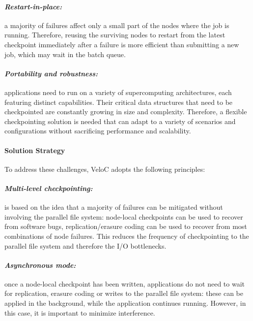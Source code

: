\paragraph{\emph{Restart-in-place:}} a majority of failures affect
only a small part of the nodes where the job is running. Therefore,
reusing the surviving nodes to restart from the latest checkpoint
immediately after a failure is more efficient than submitting a new job,
which may wait in the batch queue.
\vspace{-1em}

\paragraph{\emph{Portability and robustness:}} applications need to
run on a variety of supercomputing architectures, each featuring
distinct capabilities. Their critical data structures that need to be
checkpointed are constantly growing in size and complexity. Therefore,
a flexible checkpointing solution is needed that can adapt to a
variety of scenarios and configurations without sacrificing
performance and scalability.

\paragraph{Solution Strategy}

To address these challenges, VeloC adopts the following principles:
\vspace{-1em}

\paragraph{\emph{Multi-level checkpointing:}} is based on the idea
that a majority of failures can be mitigated without involving the
parallel file system: node-local checkpoints can be used to recover
from software bugs, replication/erasure coding can be used to recover
from most combinations of node failures. This reduces the frequency of
checkpointing to the parallel file system and therefore the I/O
bottlenecks.
\vspace{-1em}

\paragraph{\emph{Asynchronous mode:}} once a node-local checkpoint has
been written, applications do not need to wait for replication,
erasure coding or writes to the parallel file system: these can be
applied in the background, while the application continues
running. However, in this case, it is important to minimize
interference.
\vspace{-1em}

